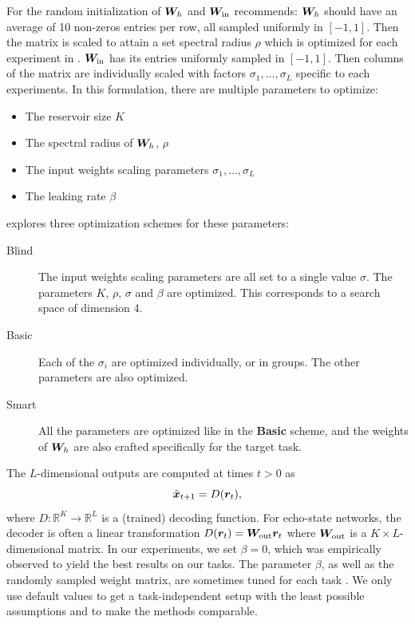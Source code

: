 For the random initialization of ${\bm{W}}_{h}$ and ${\bm{W}}_{\text{in}}$
\textcite{jaegerLongShortTermMemory2012} recommends: ${\bm{W}}_{h}$ should have an
average of 10 non-zeros entries per row, all sampled uniformly in $[-1, 1]$.
Then the matrix is scaled to attain a set spectral radius $\rho$ which is
optimized for each experiment in \parencite{jaegerLongShortTermMemory2012}.
${\bm{W}}_{\text{in}}$ has its entries uniformly sampled in $[-1, 1]$. Then columns
of the matrix are individually scaled with factors
$\sigma_{1}, \ldots, \sigma_{L}$ specific to each experiments. In this
formulation, there are multiple parameters to optimize:

\begin{itemize}
  \item The reservoir size $K$
  \item The spectral radius of ${\bm{W}}_{h}$, $\rho$
  \item The input weights scaling parameters $\sigma_{1}, \ldots, \sigma_{L}$
  \item The leaking rate $\beta$
\end{itemize}

\textcite{jaegerLongShortTermMemory2012} explores three
optimization schemes for these parameters:
\begin{description}
  \item[Blind] The input weights scaling parameters are all set to a single
        value $\sigma$. The parameters $K$, $\rho$, $\sigma$ and $\beta$ are
        optimized. This corresponds to a search space of dimension 4.
  \item[Basic] Each of the $\sigma_{i}$ are optimized individually, or in
        groups. The other parameters are also optimized.
  \item[Smart] All the parameters are optimized like in the \textbf{Basic}
        scheme, and the weights of ${\bm{W}}_{h}$ are also crafted specifically for
        the target task.
\end{description}


The $L$-dimensional outputs are computed at times $t > 0$ as
\begin{equation}
  \label{eq:esn-res}
\tilde{{\bm{x}}}_{t+ 1} = D({\bm{r}}_{t}),
\end{equation}
where $D: \mathbb{R}^{K} \rightarrow \mathbb{R}^{L}$ is a (trained) decoding
function. For echo-state networks, the decoder is often a linear transformation
$D({\bm{r}}_{t}) = {\bm{W}}_{\text{out}} {\bm{r}}_{t}$ where ${\bm{W}}_{\text{out}}$ is a
$K \times L$-dimensional matrix. In our experiments, we set $\beta = 0$, which
was empirically observed to yield the best results on our tasks. The parameter
$\beta$, as well as the randomly sampled weight matrix, are sometimes tuned for
each task \parencite{jaegerLongShortTermMemory2012}. We only use default values
to get a task-independent setup with the least possible assumptions and to make
the methods comparable.

